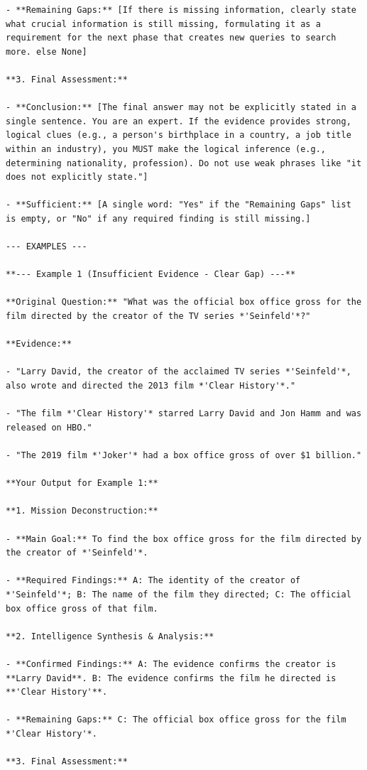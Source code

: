 \documentclass[11pt]{article}
\begin{document}
\begin{lstlisting}[basicstyle=\scriptsize\ttfamily]
- **Remaining Gaps:** [If there is missing information, clearly state what crucial information is still missing, formulating it as a requirement for the next phase that creates new queries to search more. else None]

**3. Final Assessment:**

- **Conclusion:** [The final answer may not be explicitly stated in a single sentence. You are an expert. If the evidence provides strong, logical clues (e.g., a person's birthplace in a country, a job title within an industry), you MUST make the logical inference (e.g., determining nationality, profession). Do not use weak phrases like "it does not explicitly state."]

- **Sufficient:** [A single word: "Yes" if the "Remaining Gaps" list is empty, or "No" if any required finding is still missing.]

--- EXAMPLES ---

**--- Example 1 (Insufficient Evidence - Clear Gap) ---**

**Original Question:** "What was the official box office gross for the film directed by the creator of the TV series *'Seinfeld'*?"

**Evidence:**

- "Larry David, the creator of the acclaimed TV series *'Seinfeld'*, also wrote and directed the 2013 film *'Clear History'*." 

- "The film *'Clear History'* starred Larry David and Jon Hamm and was released on HBO."

- "The 2019 film *'Joker'* had a box office gross of over $1 billion."

**Your Output for Example 1:**

**1. Mission Deconstruction:**

- **Main Goal:** To find the box office gross for the film directed by the creator of *'Seinfeld'*.

- **Required Findings:** A: The identity of the creator of *'Seinfeld'*; B: The name of the film they directed; C: The official box office gross of that film.

**2. Intelligence Synthesis & Analysis:**

- **Confirmed Findings:** A: The evidence confirms the creator is **Larry David**. B: The evidence confirms the film he directed is **'Clear History'**.

- **Remaining Gaps:** C: The official box office gross for the film *'Clear History'*.

**3. Final Assessment:**


\end{lstlisting}
\end{document}
